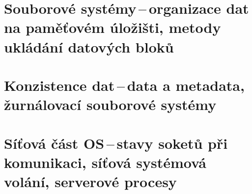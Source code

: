 
\newpage
\section{Souborové systémy\,--\,organizace dat na paměťovém úložišti, metody ukládání datových bloků}

\newpage
\section{Konzistence dat\,--\,data a metadata, žurnálovací souborové systémy}

\newpage
\section{Síťová část OS\,--\,stavy soketů při komunikaci, síťová systémová volání, serverové procesy}